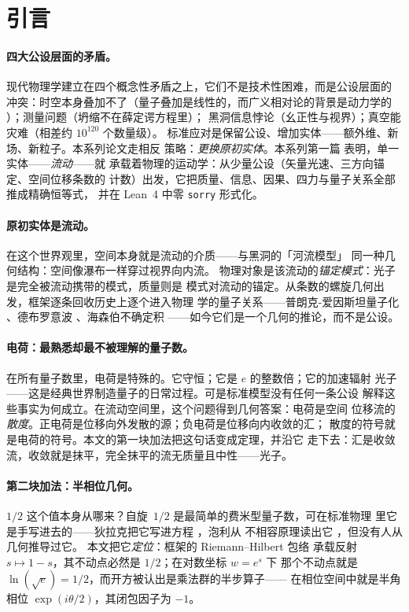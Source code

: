 \documentclass[aps,prd,preprint,superscriptaddress,amsmath,amssymb]{revtex4-2}
\begin{document}
\section{引言}
\label{sec:intro}

\paragraph{四大公设层面的矛盾。}
现代物理学建立在四个概念性矛盾之上，它们不是技术性困难，而是公设层面的
冲突：时空本身叠加不了（量子叠加是线性的，而广义相对论的背景是动力学的
\cite{einstein1915feldgleichungen}）；测量问题（坍缩不在薛定谔方程里）；
黑洞信息悖论（幺正性与视界）；真空能灾难（相差约 $10^{120}$ 个数量级）。
标准应对是保留公设、增加实体——额外维、新场、新粒子。本系列论文走相反
策略：\emph{更换原初实体}。本系列第一篇
\cite{ProjectionPhysics,HibsPhysics} 表明，单一实体——\emph{流动}——就
承载着物理的运动学：从少量公设（矢量光速、三方向锚定、空间位移条数的
计数）出发，它把质量、信息、因果、四力与量子关系全部推成精确恒等式，
并在 Lean~4 中零 \texttt{sorry} 形式化。

\paragraph{原初实体是流动。}
在这个世界观里，空间本身就是流动的介质——与黑洞的「河流模型」
\cite{hamilton2008river} 同一种几何结构：空间像瀑布一样穿过视界向内流。
物理对象是该流动的\emph{锚定模式}：光子是完全被流动携带的模式，质量则是
模式对流动的锚定。从条数的螺旋几何出发，框架逐条回收历史上逐个进入物理
学的量子关系——普朗克-爱因斯坦量子化 \cite{planck1978gesetz}、德布罗意波
\cite{de1924recherches}、海森伯不确定积 \cite{heisenberg1927anschaulichen}
——如今它们是一个几何的推论，而不是公设。

\paragraph{电荷：最熟悉却最不被理解的量子数。}
在所有量子数里，电荷是特殊的。它守恒；它是 $e$ 的整数倍；它的加速辐射
光子——这是经典世界制造量子的日常过程。可是标准模型没有任何一条公设
解释这些事实为何成立。在流动空间里，这个问题得到几何答案：电荷是空间
位移流的\emph{散度}。正电荷是位移向外发散的源；负电荷是位移向内收敛的汇；
散度的符号就是电荷的符号。本文的第一块加法把这句话变成定理，并沿它
走下去：汇是收敛流，收敛就是抹平，完全抹平的流无质量且中性——光子。

\paragraph{第二块加法：半相位几何。}
$1/2$ 这个值本身从哪来？自旋~$1/2$ 是最简单的费米型量子数，可在标准物理
里它是手写进去的——狄拉克把它写进方程 \cite{dirac1928quantum}，泡利从
不相容原理读出它 \cite{pauli1925zusammenhang}，但没有人从几何推导过它。
本文把它\emph{定位}：框架的 Riemann--Hilbert 包络 \cite{RiemannHIBS}
承载反射 $s\mapsto 1-s$，其不动点必然是 $1/2$；在对数坐标 $w=e^s$ 下
那个不动点就是 $\ln(\sqrt e)=1/2$，而开方被认出是乘法群的半步算子——
在相位空间中就是半角相位 $\exp(i\theta/2)$，其闭包因子为 $-1$。
\end{document}
